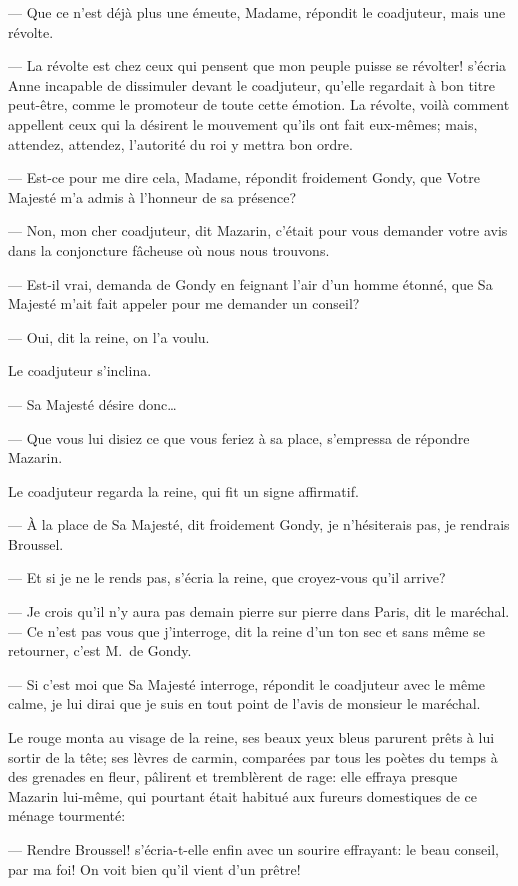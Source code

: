 — Que ce n'est déjà plus une émeute, Madame, répondit le coadjuteur, mais une révolte.

— La révolte est chez ceux qui pensent que mon peuple puisse se révolter! s'écria Anne incapable de dissimuler devant le coadjuteur, qu'elle regardait à bon titre peut-être, comme le promoteur de toute cette émotion. La révolte, voilà comment appellent ceux qui la désirent le mouvement qu'ils ont fait eux-mêmes; mais, attendez, attendez, l'autorité du roi y mettra bon ordre.

— Est-ce pour me dire cela, Madame, répondit froidement Gondy, que Votre Majesté m'a admis à l'honneur de sa présence?

— Non, mon cher coadjuteur, dit Mazarin, c'était pour vous demander votre avis dans la conjoncture fâcheuse où nous nous trouvons.

— Est-il vrai, demanda de Gondy en feignant l'air d'un homme étonné, que Sa Majesté m'ait fait appeler pour me demander un conseil?

— Oui, dit la reine, on l'a voulu.

Le coadjuteur s'inclina.

— Sa Majesté désire donc\dots

— Que vous lui disiez ce que vous feriez à sa place, s'empressa de répondre Mazarin.

Le coadjuteur regarda la reine, qui fit un signe affirmatif.

— À la place de Sa Majesté, dit froidement Gondy, je n'hésiterais pas, je rendrais Broussel.

— Et si je ne le rends pas, s'écria la reine, que croyez-vous qu'il arrive?

— Je crois qu'il n'y aura pas demain pierre sur pierre dans Paris, dit le maréchal.
— Ce n'est pas vous que j'interroge, dit la reine d'un ton sec et sans même se retourner, c'est M.~de Gondy.

— Si c'est moi que Sa Majesté interroge, répondit le coadjuteur avec le même calme, je lui dirai que je suis en tout point de l'avis de monsieur le maréchal.

Le rouge monta au visage de la reine, ses beaux yeux bleus parurent prêts à lui sortir de la tête; ses lèvres de carmin, comparées par tous les poètes du temps à des grenades en fleur, pâlirent et tremblèrent de rage: elle effraya presque Mazarin lui-même, qui pourtant était habitué aux fureurs domestiques de ce ménage tourmenté:

— Rendre Broussel! s'écria-t-elle enfin avec un sourire effrayant: le beau conseil, par ma foi! On voit bien qu'il vient d'un prêtre!

